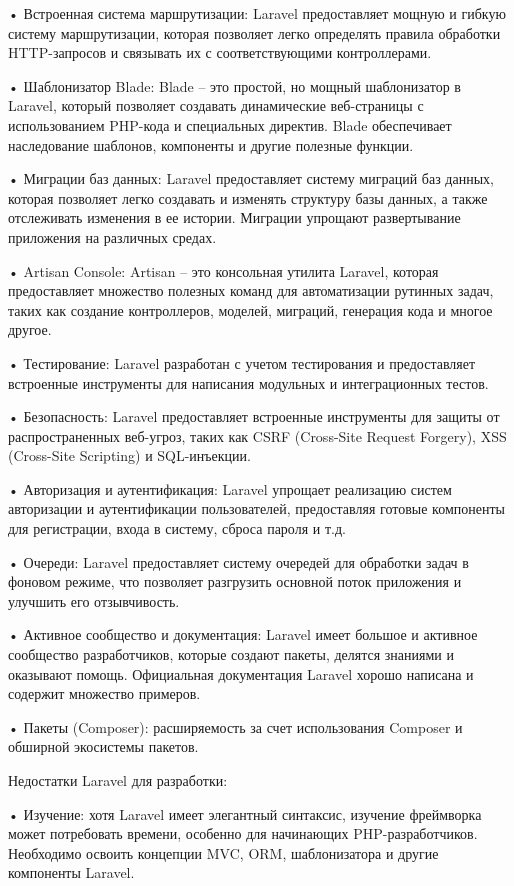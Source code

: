 •	Встроенная система маршрутизации: Laravel предоставляет мощную и гибкую систему маршрутизации, которая позволяет легко определять правила обработки HTTP-запросов и связывать их с соответствующими контроллерами.

•	Шаблонизатор Blade: Blade – это простой, но мощный шаблонизатор в Laravel, который позволяет создавать динамические веб-страницы с использованием PHP-кода и специальных директив. Blade обеспечивает наследование шаблонов, компоненты и другие полезные функции.

•	Миграции баз данных: Laravel предоставляет систему миграций баз данных, которая позволяет легко создавать и изменять структуру базы данных, а также отслеживать изменения в ее истории. Миграции упрощают развертывание приложения на различных средах.

•	Artisan Console: Artisan – это консольная утилита Laravel, которая предоставляет множество полезных команд для автоматизации рутинных задач, таких как создание контроллеров, моделей, миграций, генерация кода и многое другое.

•	Тестирование: Laravel разработан с учетом тестирования и предоставляет встроенные инструменты для написания модульных и интеграционных тестов.

•	Безопасность: Laravel предоставляет встроенные инструменты для защиты от распространенных веб-угроз, таких как CSRF (Cross-Site Request Forgery), XSS (Cross-Site Scripting) и SQL-инъекции.

•	Авторизация и аутентификация: Laravel упрощает реализацию систем авторизации и аутентификации пользователей, предоставляя готовые компоненты для регистрации, входа в систему, сброса пароля и т.д.

•	Очереди: Laravel предоставляет систему очередей для обработки задач в фоновом режиме, что позволяет разгрузить основной поток приложения и улучшить его отзывчивость.

•	Активное сообщество и документация: Laravel имеет большое и активное сообщество разработчиков, которые создают пакеты, делятся знаниями и оказывают помощь. Официальная документация Laravel хорошо написана и содержит множество примеров.

•	Пакеты (Composer): расширяемость за счет использования Composer и обширной экосистемы пакетов.

Недостатки Laravel для разработки:

•	Изучение: хотя Laravel имеет элегантный синтаксис, изучение фреймворка может потребовать времени, особенно для начинающих PHP-разработчиков. Необходимо освоить концепции MVC, ORM, шаблонизатора и другие компоненты Laravel.


